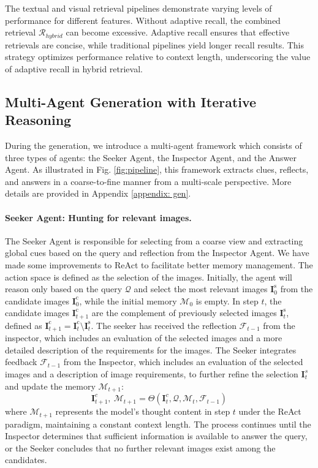 The textual and visual retrieval pipelines demonstrate varying levels of performance for different features. Without adaptive recall, the combined retrieval $\mathcal{R}_{hybrid}$ can become excessive. Adaptive recall ensures that effective retrievals are concise, while traditional pipelines yield longer recall results. This strategy optimizes performance relative to context length, underscoring the value of adaptive recall in hybrid retrieval.

\subsection{Multi-Agent Generation with Iterative Reasoning}
\label{sec:gen}
During the generation, we introduce a multi-agent framework which consists of three types of agents: the Seeker Agent, the Inspector Agent, and the Answer Agent. As illustrated in Fig. \ref{fig:pipeline}, this framework extracts clues, reflects, and answers in a coarse-to-fine manner from a multi-scale perspective. More details are provided in Appendix \ref{appendix: gen}.



\paragraph{Seeker Agent: Hunting for relevant images.} 
The Seeker Agent is responsible for selecting from a coarse view and extracting global cues based on the query and reflection from the Inspector Agent. We have made some improvements to ReAct\cite{yao2022react} to facilitate better memory management. 
The action space is defined as the selection of the images. Initially, the agent will reason only based on the query $\mathcal{Q}$ and select the most relevant images $\mathbf{I}^{\text{s}}_0$ from the candidate images $\mathbf{I}^{\text{c}}_0$, while the initial memory $\mathcal{M}_0$ is empty.
In step $t$, the candidate images $\mathbf{I}^{\text{c}}_{t + 1}$ are the complement of previously selected images $\mathbf{I}^{\text{s}}_{t}$, defined as $\mathbf{I}^{\text{c}}_{t + 1}=\mathbf{I}^{\text{c}}_{t}\setminus\mathbf{I}^{\text{s}}_{t}$.
The seeker has received the reflection $\mathcal{F}_{t - 1}$ from the inspector, which includes an evaluation of the selected images and a more detailed description of the requirements for the images. The Seeker integrates feedback $\mathcal{F}_{t - 1}$ from the Inspector, which includes an evaluation of the selected images and a description of image requirements, to further refine the selection $\mathbf{I}^{s}_{t}$ and update the memory $\mathcal{M}_{t+1}$:
\begin{equation}
\mathbf{I}^{c}_{t+1},~\mathcal{M}_{t+1} = \Theta(\mathbf{I}^{c}_{t},\mathcal{Q}, \mathcal{M}_{t}, \mathcal{F}_{t-1})
\end{equation}
where $\mathcal{M}_{t+1}$ represents the model's thought content in step $t$ under the ReAct paradigm, maintaining a constant context length. The process continues until the Inspector determines that sufficient information is available to answer the query, or the Seeker concludes that no further relevant images exist among the candidates.

